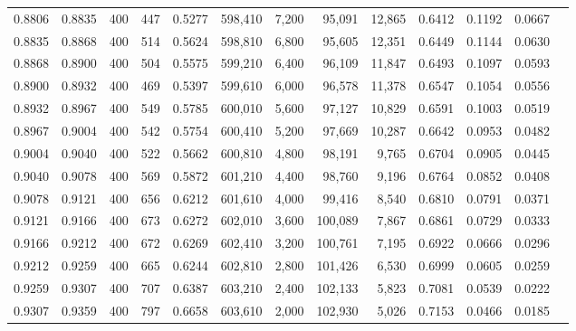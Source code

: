 \begin{tabular}{rrrrrrrrrrrrr}
0.8806 & 0.8835 &    400 &   447 &                                     0.5277 & 598,410 &   7,200 &  95,091 &  12,865 & 0.6412 & 0.1192 & 0.0667 \\
0.8835 & 0.8868 &    400 &   514 &                                     0.5624 & 598,810 &   6,800 &  95,605 &  12,351 & 0.6449 & 0.1144 & 0.0630 \\
0.8868 & 0.8900 &    400 &   504 &                                     0.5575 & 599,210 &   6,400 &  96,109 &  11,847 & 0.6493 & 0.1097 & 0.0593 \\
0.8900 & 0.8932 &    400 &   469 &                                     0.5397 & 599,610 &   6,000 &  96,578 &  11,378 & 0.6547 & 0.1054 & 0.0556 \\
0.8932 & 0.8967 &    400 &   549 &                                     0.5785 & 600,010 &   5,600 &  97,127 &  10,829 & 0.6591 & 0.1003 & 0.0519 \\
0.8967 & 0.9004 &    400 &   542 &                                     0.5754 & 600,410 &   5,200 &  97,669 &  10,287 & 0.6642 & 0.0953 & 0.0482 \\
0.9004 & 0.9040 &    400 &   522 &                                     0.5662 & 600,810 &   4,800 &  98,191 &   9,765 & 0.6704 & 0.0905 & 0.0445 \\
0.9040 & 0.9078 &    400 &   569 &                                     0.5872 & 601,210 &   4,400 &  98,760 &   9,196 & 0.6764 & 0.0852 & 0.0408 \\
0.9078 & 0.9121 &    400 &   656 &                                     0.6212 & 601,610 &   4,000 &  99,416 &   8,540 & 0.6810 & 0.0791 & 0.0371 \\
0.9121 & 0.9166 &    400 &   673 &                                     0.6272 & 602,010 &   3,600 & 100,089 &   7,867 & 0.6861 & 0.0729 & 0.0333 \\
0.9166 & 0.9212 &    400 &   672 &                                     0.6269 & 602,410 &   3,200 & 100,761 &   7,195 & 0.6922 & 0.0666 & 0.0296 \\
0.9212 & 0.9259 &    400 &   665 &                                     0.6244 & 602,810 &   2,800 & 101,426 &   6,530 & 0.6999 & 0.0605 & 0.0259 \\
0.9259 & 0.9307 &    400 &   707 &                                     0.6387 & 603,210 &   2,400 & 102,133 &   5,823 & 0.7081 & 0.0539 & 0.0222 \\
0.9307 & 0.9359 &    400 &   797 &                                     0.6658 & 603,610 &   2,000 & 102,930 &   5,026 & 0.7153 & 0.0466 & 0.0185 \\

\end{tabular}
